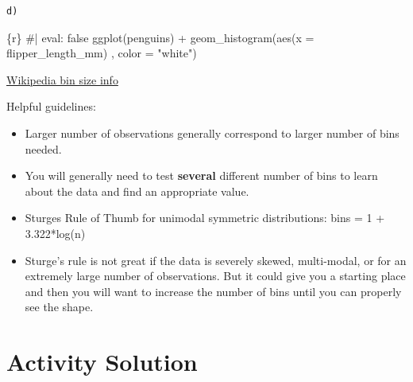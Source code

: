 \documentclass[
  letterpaper,
  DIV=11,
  numbers=noendperiod]{scrreprt}
\newenvironment{Shaded}{\begin{snugshade}}{\end{snugshade}}
\newcommand{\AttributeTok}[1]{\textcolor[rgb]{0.40,0.45,0.13}{#1}}
\newcommand{\CommentTok}[1]{\textcolor[rgb]{0.37,0.37,0.37}{#1}}
\newcommand{\FunctionTok}[1]{\textcolor[rgb]{0.28,0.35,0.67}{#1}}
\newcommand{\InformationTok}[1]{\textcolor[rgb]{0.37,0.37,0.37}{#1}}
\newcommand{\NormalTok}[1]{\textcolor[rgb]{0.00,0.23,0.31}{#1}}
\newcommand{\SpecialCharTok}[1]{\textcolor[rgb]{0.37,0.37,0.37}{#1}}
\newcommand{\StringTok}[1]{\textcolor[rgb]{0.13,0.47,0.30}{#1}}
\begin{document}
\begin{tcolorbox}[enhanced jigsaw, colframe=quarto-callout-note-color-frame, breakable, colback=white, toprule=.15mm, leftrule=.75mm, left=2mm, opacityback=0, rightrule=.15mm, arc=.35mm, bottomrule=.15mm]
\begin{verbatim}
d)  
\end{verbatim}

\begin{Shaded}
\begin{Highlighting}[]
\InformationTok{\textasciigrave{}\textasciigrave{}\textasciigrave{}\{r\}}
\CommentTok{\#| eval: false}
\FunctionTok{ggplot}\NormalTok{(penguins) }\SpecialCharTok{+}
  \FunctionTok{geom\_histogram}\NormalTok{(}\FunctionTok{aes}\NormalTok{(}\AttributeTok{x =}\NormalTok{ flipper\_length\_mm) , }\AttributeTok{color =} \StringTok{"white"}\NormalTok{)}
\InformationTok{\textasciigrave{}\textasciigrave{}\textasciigrave{}}
\end{Highlighting}
\end{Shaded}

\end{tcolorbox}

\begin{tcolorbox}[enhanced jigsaw, colframe=quarto-callout-note-color-frame, breakable, colback=white, toprule=.15mm, leftrule=.75mm, left=2mm, opacityback=0, rightrule=.15mm, arc=.35mm, bottomrule=.15mm]

\href{https://en.wikipedia.org/wiki/Histogram\#Number_of_bins_and_width}{Wikipedia
bin size info}

Helpful guidelines:

\begin{itemize}
\item
  Larger number of observations generally correspond to larger number of
  bins needed.
\item
  You will generally need to test \textbf{several} different number of
  bins to learn about the data and find an appropriate value.
\item
  Sturges Rule of Thumb for unimodal symmetric distributions: bins = 1 +
  3.322*log(n)
\item
  Sturge's rule is not great if the data is severely skewed,
  multi-modal, or for an extremely large number of observations. But it
  could give you a starting place and then you will want to increase the
  number of bins until you can properly see the shape.
\end{itemize}

\end{tcolorbox}

\hypertarget{activity-solution-2}{%
\section*{Activity Solution}\label{activity-solution-2}}
\end{document}
